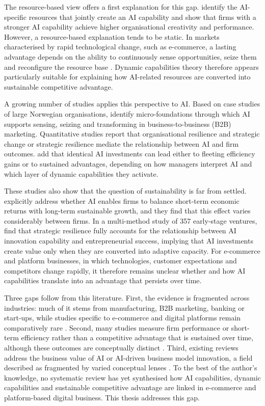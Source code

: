 The resource-based view offers a first explanation for this gap. \textcite[1]{mikalef2021capability} identify the AI-specific resources that jointly create an AI capability and show that firms with a stronger AI capability achieve higher organisational creativity and performance. However, a resource-based explanation tends to be static. In markets characterised by rapid technological change, such as e-commerce, a lasting advantage depends on the ability to continuously sense opportunities, seize them and reconfigure the resource base \parencite[1319]{teece2007}. Dynamic capabilities theory therefore appears particularly suitable for explaining how AI-related resources are converted into sustainable competitive advantage.

A growing number of studies applies this perspective to AI. Based on case studies of large Norwegian organisations, \textcite[80]{mikalef2021b2b} identify micro-foundations through which AI supports sensing, seizing and transforming in business-to-business (B2B) marketing. Quantitative studies report that organisational resilience and strategic change \parencite[1]{liang2026} or strategic resilience \parencite[1]{wang2026} mediate the relationship between AI and firm outcomes. \textcite[1]{wu2026} add that identical AI investments can lead either to fleeting efficiency gains or to sustained advantages, depending on how managers interpret AI and which layer of dynamic capabilities they activate.

These studies also show that the question of sustainability is far from settled. \textcite[1]{liang2026} explicitly address whether AI enables firms to balance short-term economic returns with long-term sustainable growth, and they find that this effect varies considerably between firms. In a multi-method study of 357 early-stage ventures, \textcite[1]{wang2026} find that strategic resilience fully accounts for the relationship between AI innovation capability and entrepreneurial success, implying that AI investments create value only when they are converted into adaptive capacity. For e-commerce and platform businesses, in which technologies, customer expectations and competitors change rapidly, it therefore remains unclear whether and how AI capabilities translate into an advantage that persists over time.

Three gaps follow from this literature. First, the evidence is fragmented across industries: much of it stems from manufacturing, B2B marketing, banking or start-ups, while studies specific to e-commerce and digital platforms remain comparatively rare \parencites[1]{chen2022}[1]{bunea2026}. Second, many studies measure firm performance or short-term efficiency rather than a competitive advantage that is sustained over time, although these outcomes are conceptually distinct \parencite[1]{wu2026}. Third, existing reviews address the business value of AI \parencite[1709]{enholm2022} or AI-driven business model innovation, a field described as fragmented by varied conceptual lenses \parencite[1]{jorzik2024}. To the best of the author's knowledge, no systematic review has yet synthesised how AI capabilities, dynamic capabilities and sustainable competitive advantage are linked in e-commerce and platform-based digital business. This thesis addresses this gap.

